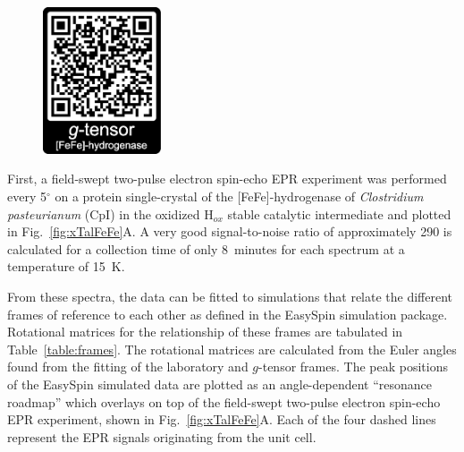 \begin{figure}
\centering
\includegraphics[width=3.5cm]{Kapitel/Appendix/FeFegtensorQR.eps}
\end{figure}

First, a field-swept two-pulse electron spin-echo EPR experiment was performed every 5$^{\circ}$ on a protein single-crystal of the [FeFe]-hydrogenase of \textit{Clostridium pasteurianum} (CpI) in the oxidized H$_{ox}$ stable catalytic intermediate and plotted in Fig.~\ref{fig:xTalFeFe}A. A very good signal-to-noise ratio of approximately 290 is calculated for a collection time of only 8~minutes for each spectrum at a temperature of 15~K. 

From these spectra, the data can be fitted to simulations that relate the different frames of reference to each other as defined in the EasySpin simulation package. Rotational matrices for the relationship of these frames are tabulated in Table~\ref{table:frames}. The rotational matrices are calculated from the Euler angles found from the fitting of the laboratory and $g$-tensor frames. The peak positions of the EasySpin simulated data are plotted as an angle-dependent ``resonance roadmap'' which overlays on top of the field-swept two-pulse electron spin-echo EPR experiment, shown in Fig.~\ref{fig:xTalFeFe}A. Each of the four dashed lines represent the EPR signals originating from the unit cell.

